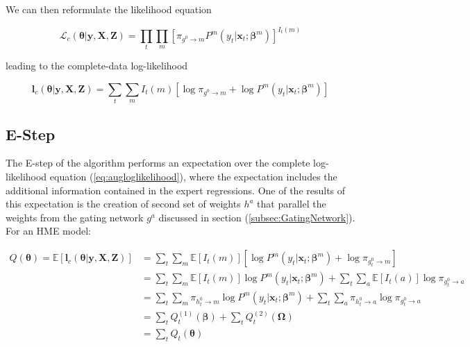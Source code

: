 \documentclass[12pt]{article}
\newcommand{\EIm}[1]{\mathbb{E} \left[ I_{t}(#1) \right]}
\newcommand{\gateprod}[2]{\pi_{#1 \longrightarrow #2}}
\theoremstyle{definition}
\begin{document}
We can then reformulate the likelihood equation

\begin{equation}  \label{eq:auglikelihood}
  \mathcal{L}_{c}(\boldsymbol{\theta}| \boldsymbol{y}, \boldsymbol{X}, \boldsymbol{Z}) = \prod_{t} \prod_{m} \left[ \gateprod{g^{0}}{m}  P^{m}(y_{t}| \boldsymbol{x}_{t}; \boldsymbol{\beta}^{m}) \right]^{I_{t}(m)}
\end{equation}

leading to the complete-data log-likelihood

\begin{equation}  \label{eq:augloglikelihood}
  \boldsymbol{l}_{c}(\boldsymbol{\theta}| \boldsymbol{y}, \boldsymbol{X}, \boldsymbol{Z}) = \sum_{t} \sum_{m} I_{t}(m) \left[\log \gateprod{g^{0}}{m} + \log P^{m}(y_{t}| \boldsymbol{x}_{t}; \boldsymbol{\beta}^{m}) \right]
\end{equation}


\subsection{E-Step} \label{sec:Estep}
The E-step of the algorithm performs an expectation over the complete log-likelihood equation (\ref{eq:augloglikelihood}), where the expectation includes the additional information contained in the expert regressions. One of the results of this expectation is the creation of second set of weights $h^{a}$ that parallel the weights from the gating network $g^{a}$ discussed in section (\ref{subsec:GatingNetwork}). For an HME model:

\begin{equation} \label{eq:Estep}
  \begin{split}
  Q(\boldsymbol{\theta}) = \mathbb{E} \left [ \boldsymbol{l}_{c}(\boldsymbol{\theta}| \boldsymbol{y}, \boldsymbol{X}, \boldsymbol{Z}) \right] & = \sum_{t}\sum_{m} \EIm{m} \left[ \log P^{m}(y_{t}| \boldsymbol{x}_{t}; \boldsymbol{\beta}^{m}) + \log \gateprod{g^{0}_{t}}{m} \right] \\ 
   & = \sum_{t} \sum_{m} \EIm{m}  \log P^{m}(y_{t}| \boldsymbol{x}_{t}; \boldsymbol{\beta}^{m})   +       \sum_{t} \sum_{a} \mathbb{E} \left[ I_{t}(a) \right] \log \gateprod{g^{0}_{t}}{a} \\
   & = \sum_{t} \sum_{m} \gateprod{h^{0}_{t}}{m}  \log P^{m}(y_{t}| \boldsymbol{x}_{t}; \boldsymbol{\beta}^{m})   +       \sum_{t} \sum_{a} \gateprod{h^{0}_{t}}{a} \log \gateprod{g^{0}_{t}}{a} \\
   & = \sum_{t} Q^{(1)}_{t} (\boldsymbol{\beta}) + \sum_{t} Q^{(2)}_{t} (\boldsymbol{\Omega}) \\
   & = \sum_{t} Q_{t}(\boldsymbol{\theta})
 \end{split}
\end{equation}
\end{document}
